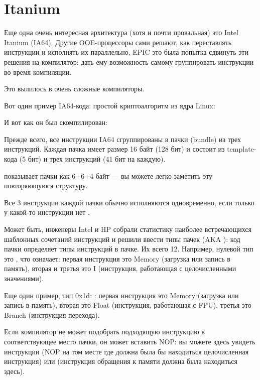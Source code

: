\section{Itanium}
\label{itanium}
Еще одна очень интересная архитектура (хотя и почти провальная) это Intel Itanium (\ac{IA64}).
Другие \ac{OOE}-процессоры сами решают, как переставлять инструкции и исполнять их параллельно,
\ac{EPIC} это была попытка сдвинуть эти решения на компилятор: дать ему возможность самому 
группировать инструкции во время компиляции.

Это вылилось в очень сложные компиляторы.

Вот один пример \ac{IA64}-кода: простой криптоалгоритм из ядра Linux:



И вот как он был скомпилирован:



Прежде всего, все инструкции \ac{IA64} сгруппированы в пачки (bundle) из трех инструкций.
Каждая пачка имеет размер 16 байт (128 бит) и состоит из template-кода (5 бит) и трех инструкций (41 бит на каждую).

\IDA показывает пачки как 6+6+4 байт --- вы можете легко заметить эту повторяющуюся структуру.

Все 3 инструкции каждой пачки обычно исполняются одновременно, если только у какой-то инструкции
нет .

Может быть, инженеры Intel и HP собрали статистику наиболее встречающихся шаблонных сочетаний
инструкций и решили ввести типы пачек (\ac{AKA} ): код пачки определяет типы инструкций
в пачке.
Их всего 12.
Например, нулевой тип это , что означает: первая инструкция это Memory (загрузка
или запись в память), вторая и третья это I (инструкция, работающая с целочисленными значениями).

Еще один пример, тип 0x1d: : первая инструкция это Memory (загрузка или запись
в память), вторая это Float (инструкция, работающая с \ac{FPU}), третья это Branch (инструкция
перехода).

Если компилятор не может подобрать подходящую инструкцию в соответствующее место пачки,
он может вставить \ac{NOP}:
вы можете здесь увидеть инструкции  (\ac{NOP} на том месте где должна была бы находиться
целочисленная инструкция) или  (инструкция обращения к памяти должна была находиться
здесь).

